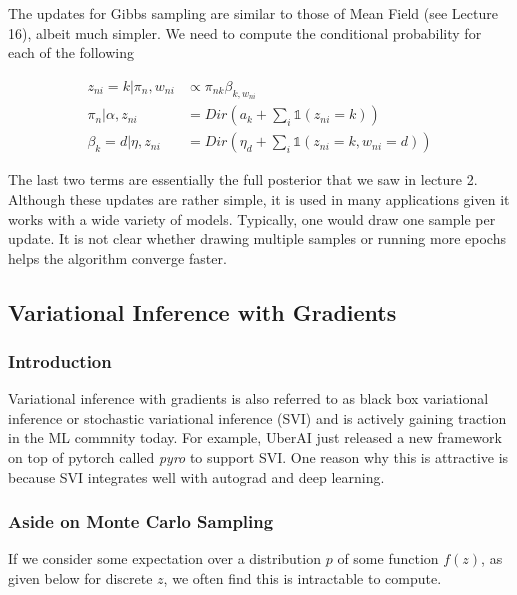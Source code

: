\documentclass{article}
\begin{document}

The updates for Gibbs sampling are similar to those of Mean Field (see Lecture 16), albeit much simpler. We need to compute the conditional probability for each of the following

\begin{align*}
z_{ni} = k | \pi_n, w_{ni} &\propto \pi_{nk}\beta_{k,w_{ni}} \\
\pi_n | \alpha, z_{ni} &= Dir(a_k + \sum_{i}\mathbb{1}(z_{ni} = k)) \\
\beta_k = d | \eta, z_{ni} &= Dir(\eta_d + \sum_{i}\mathbb{1}(z_{ni} = k, w_{ni} = d))
\end{align*}

The last two terms are essentially the full posterior that we saw in lecture 2. Although these updates are rather simple, it is used in many applications given it works with a wide variety of models. Typically, one would draw one sample per update. It is not clear whether drawing multiple samples or running more epochs helps the algorithm converge faster. 

\subsection{Variational Inference with Gradients}

\subsubsection{Introduction}
Variational inference with gradients is also referred to as black box variational inference or stochastic variational inference (SVI) and is actively gaining traction in the ML commnity today.  
For example, UberAI just released a new framework on top of pytorch called \textit{pyro} to support SVI.  
One reason why this is attractive is because SVI integrates well with autograd and deep learning.


\subsubsection{Aside on Monte Carlo Sampling}

If we consider some expectation over a distribution $p$ of some function $f(z)$, as given below for discrete $z$, we often find this is intractable to compute.
\end{document}
